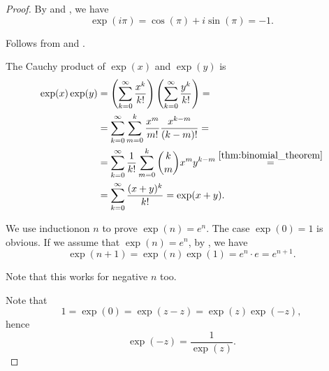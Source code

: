 \begin{proof}
   By  and , we have
  \begin{equation*}
    \exp(i\pi) = \cos(\pi) + i\sin(\pi) = -1.
  \end{equation*}

   Follows from  and .

   The Cauchy product of \( \exp(x) \) and \( \exp(y) \) is
  \begin{align*}
    \exp(x) \exp(y)
     & =
    \left( \sum_{k=0}^\infty \frac {x^k} {k!} \right) \left( \sum_{k=0}^\infty \frac {y^k} {k!} \right)
    =                                       \\ &=
    \sum_{k=0}^\infty \sum_{m=0}^k \frac {x^m} {m!} \frac {x^{k-m}} {(k-m)!}
    =                                       \\ &=
    \sum_{k=0}^\infty \frac 1 {k!} \sum_{m=0}^k \binom{k}{m} x^m y^{k-m}
    \overset {\ref{thm:binomial_theorem}} = \\ &=
    \sum_{k=0}^\infty \frac {(x + y)^k} {k!}
    =
    \exp(x + y).
  \end{align*}

   We use induction\IND on \( n \) to prove \( \exp(n) = e^n \). The case \( \exp(0) = 1 \) is obvious. If we assume that \( \exp(n) = e^n \), by , we have
  \begin{equation*}
    \exp(n + 1)
    =
    \exp(n) \exp(1)
    =
    e^n \cdot e
    =
    e^{n+1}.
  \end{equation*}

  Note that this works for negative \( n \) too.

   Note that
  \begin{equation*}
    1 = \exp(0) = \exp(z - z) = \exp(z) \exp(-z),
  \end{equation*}
  hence
  \begin{equation*}
    \exp(-z) = \frac 1 {\exp(z)}.
  \end{equation*}


\end{proof}
